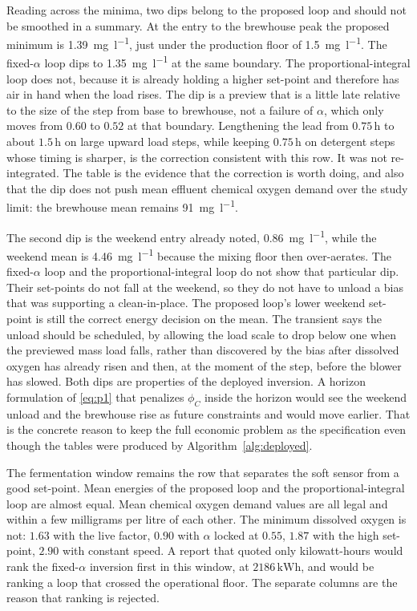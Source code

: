 Reading across the minima, two dips belong to the proposed loop and should not be smoothed in a summary. At the entry to the brewhouse peak the proposed minimum is \SI{1.39}{\milli\gram\per\litre}, just under the production floor of \SI{1.5}{\milli\gram\per\litre}. The fixed-$\alpha$ loop dips to \SI{1.35}{\milli\gram\per\litre} at the same boundary. The proportional-integral loop does not, because it is already holding a higher set-point and therefore has air in hand when the load rises. The dip is a preview that is a little late relative to the size of the step from base to brewhouse, not a failure of $\alpha$, which only moves from $0.60$ to $0.52$ at that boundary. Lengthening the lead from $0.75\,\mathrm{h}$ to about $1.5\,\mathrm{h}$ on large upward load steps, while keeping $0.75\,\mathrm{h}$ on detergent steps whose timing is sharper, is the correction consistent with this row. It was not re-integrated. The table is the evidence that the correction is worth doing, and also that the dip does not push mean effluent chemical oxygen demand over the study limit: the brewhouse mean remains \SI{91}{\milli\gram\per\litre}.

The second dip is the weekend entry already noted, \SI{0.86}{\milli\gram\per\litre}, while the weekend mean is \SI{4.46}{\milli\gram\per\litre} because the mixing floor then over-aerates. The fixed-$\alpha$ loop and the proportional-integral loop do not show that particular dip. Their set-points do not fall at the weekend, so they do not have to unload a bias that was supporting a clean-in-place. The proposed loop's lower weekend set-point is still the correct energy decision on the mean. The transient says the unload should be scheduled, by allowing the load scale to drop below one when the previewed mass load falls, rather than discovered by the bias after dissolved oxygen has already risen and then, at the moment of the step, before the blower has slowed. Both dips are properties of the deployed inversion. A horizon formulation of \eqref{eq:p1} that penalizes $\phi_{C}$ inside the horizon would see the weekend unload and the brewhouse rise as future constraints and would move earlier. That is the concrete reason to keep the full economic problem as the specification even though the tables were produced by Algorithm~\ref{alg:deployed}.

The fermentation window remains the row that separates the soft sensor from a good set-point. Mean energies of the proposed loop and the proportional-integral loop are almost equal. Mean chemical oxygen demand values are all legal and within a few milligrams per litre of each other. The minimum dissolved oxygen is not: $1.63$ with the live factor, $0.90$ with $\alpha$ locked at $0.55$, $1.87$ with the high set-point, $2.90$ with constant speed. A report that quoted only kilowatt-hours would rank the fixed-$\alpha$ inversion first in this window, at $2186\,\mathrm{kWh}$, and would be ranking a loop that crossed the operational floor. The separate columns are the reason that ranking is rejected.

